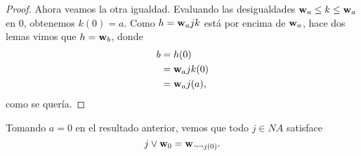 \begin{proof}
    Ahora veamos la otra igualdad.
    Evaluando las desigualdades $\mathbf w_{a}\leq k\leq \mathbf w_{a}$
    en $0$, obtenemos $k(0)=a$.
    Como $h=\mathbf w_{a}jk$ está por encima de $\mathbf w_{a}$,
    hace dos lemas vimos que $h=\mathbf w_{b}$, donde
    \begin{align*}
        b
        &= h(0) \\
        &= \mathbf w_{a}jk(0) \\
        &= \mathbf w_{a}j(a),
    \end{align*}
    como se quería.
\end{proof}

\begin{corollary}
    Tomando $a=0$ en el resultado anterior,
    vemos que todo $j\in NA$ satisface
    \[
        j\vee\mathbf w_{0} = \mathbf w_{\neg\neg j(0)}
    .\]
\end{corollary}


